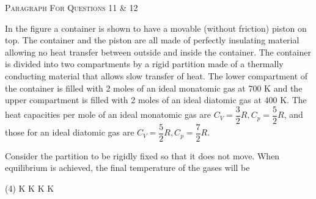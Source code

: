 
\begin{center}
    \textsc{Paragraph For Questions 11 \& 12}
\end{center}

In the figure a container is shown to have a movable (without friction) piston on top. The container and the piston are all made of perfectly insulating material allowing no heat transfer between outside and inside the container. The container is divided into two compartments by a rigid partition made of a thermally conducting material that allows slow transfer of heat. The lower compartment of the container is filled with 2 moles of an ideal monatomic gas at 700 K and the upper compartment is filled with 2 moles of an ideal diatomic gas at 400 K. The heat capacities per mole of an ideal monatomic gas are $C_V = \dfrac{3}{2} R, C_p = \dfrac{5}{2} R$, and those for an ideal diatomic gas are $C_V = \dfrac{5}{2} R,C_p = \dfrac{7}{2} R$.

\begin{center}
\end{center} 

\item Consider the partition to be rigidly fixed so that it does not move. When equilibrium is achieved, the final temperature of the gases will be
    \begin{tasks}(4)
         K
         K
         K
         K
    \end{tasks}


